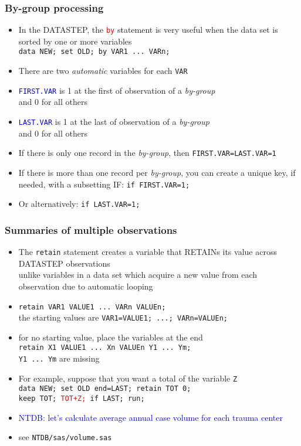 \documentclass[11pt,pdftex,dvipsnames,usenames,helvetica]{beamer}
\begin{document}
\begin{frame}[fragile]
\frametitle{By-group processing}
\begin{itemize}
\item In the DATASTEP, the \textcolor{red}{\tt by} statement is very useful
  when the data set is sorted by one or more variables\\
  {\tt data NEW; set OLD; by VAR1 ...\ VARn;}
\item There are two {\it automatic} variables for each {\tt VAR}
\item \textcolor{blue}{\tt FIRST.VAR} is 1 at the first of observation of a {\it by-group}\\
  and 0 for all others
\item \textcolor{blue}{\tt LAST.VAR} is 1 at the last of observation of a {\it by-group}\\
  and 0 for all others
\item If there is only one record in the {\it by-group},
then {\tt FIRST.VAR=LAST.VAR=1}
\item If there is more than one record per {\it by-group}, you can
  create a unique key, if needed, with a subsetting IF: {\tt if
    FIRST.VAR=1;}
\item Or alternatively: {\tt if LAST.VAR=1;} 
\end{itemize}

\end{frame}

\begin{frame}[fragile]
\frametitle{Summaries of multiple observations}
\begin{itemize}
\item The {\tt retain} statement creates a variable 
that RETAINs its value across DATASTEP observations\\
unlike variables in a data set which acquire a new value
from each observation due to automatic looping
\item {\tt retain VAR1 VALUE1 ...\ VARn VALUEn;}\\
the starting values are {\tt VAR1=VALUE1; ...; VARn=VALUEn;}\\
\item for no starting value, place the variables at the end\\
{\tt retain X1 VALUE1 ...\ Xn VALUEn Y1 ...\ Ym;}\\
{\tt Y1 ...\ Ym} are missing
\item For example, suppose that you want a total of the 
variable {\tt Z}\\
{\tt data NEW; set OLD end=LAST; retain TOT 0;\\ keep TOT; 
\textcolor{red}{TOT+Z;} if LAST; run;}
\item \textcolor{blue}{NTDB: let's calculate average annual
case volume for each trauma center}
\item see {\tt NTDB/sas/volume.sas}
\end{itemize}

\end{frame}
\end{document}
